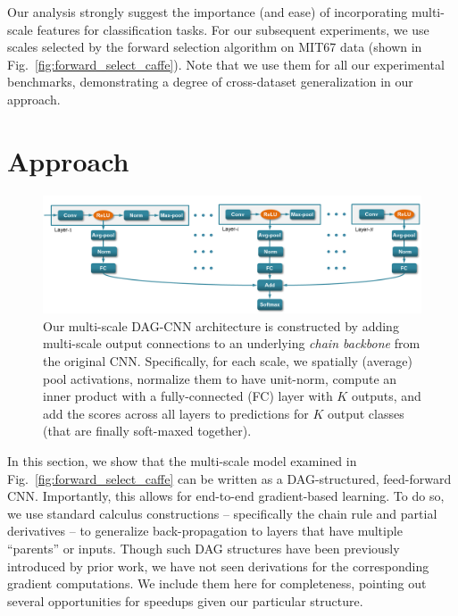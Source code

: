 \documentclass[10pt,twocolumn,letterpaper]{article}
\begin{document}
Our analysis strongly suggest the importance (and ease) of incorporating multi-scale features for classification tasks. For our subsequent experiments, we use scales selected by the forward selection algorithm on MIT67 data (shown in Fig.~\ref{fig:forward_select_caffe}). Note that we use them for all our experimental benchmarks, demonstrating a degree of cross-dataset generalization in our approach. 

\section{Approach\label{sec:approach}} 

\begin{figure}[t!]
\centering
	\includegraphics[width=.9\textwidth]{fig/fig_model.png}
\caption{Our multi-scale DAG-CNN architecture is constructed by adding multi-scale output connections to an underlying {\em chain backbone} from the original CNN. Specifically, for each scale, we spatially (average) pool activations, normalize them to have unit-norm, compute an inner product with a fully-connected (FC) layer with $K$ outputs, and add the scores across all layers to predictions for $K$ output classes (that are finally soft-maxed together).}
\label{fig:model}
\end{figure}

In this section, we show that the multi-scale model examined in Fig.~\ref{fig:forward_select_caffe} can be written as a DAG-structured, feed-forward CNN. Importantly, this allows for end-to-end gradient-based learning. To do so, we use standard calculus constructions -- specifically the chain rule and partial derivatives -- to generalize back-propagation to layers that have multiple ``parents'' or inputs. Though such DAG structures have been previously introduced by prior work, we have not seen derivations for the corresponding gradient computations. We include them here for completeness, pointing out several opportunities for speedups given our particular structure.
\end{document}
